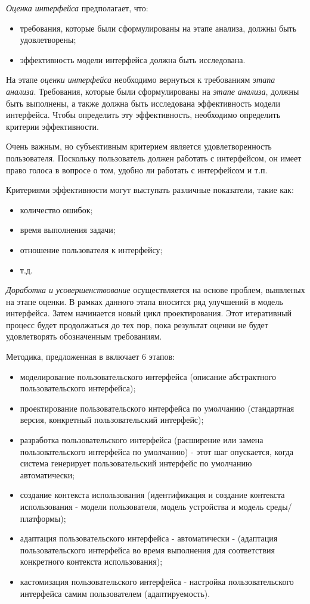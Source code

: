 \textit{Оценка интерфейса} предполагает, что:
\begin{itemize}
	\item требования, которые были сформулированы на этапе анализа, должны быть удовлетворены;
	\item эффективность модели интерфейса должна быть исследована.
\end{itemize}

На этапе \textit{оценки интерфейса} необходимо вернуться к требованиям \textit{этапа анализа}. Требования, которые
были сформулированы на \textit{этапе анализа}, должны быть выполнены, а также должна быть исследована эффективность модели интерфейса.
Чтобы определить эту эффективность, необходимо определить критерии эффективности.

Очень важным, но субъективным критерием является удовлетворенность пользователя. Поскольку пользователь должен работать с интерфейсом, он имеет право голоса в вопросе о том, удобно ли работать с интерфейсом и т.п.

Критериями эффективности могут выступать различные показатели, такие как:
\begin{itemize}
	\item количество ошибок;
	\item время выполнения задачи;
	\item отношение пользователя к интерфейсу;
	\item т.д.
\end{itemize}

\textit{Доработка и усовершенствование} осуществляется на основе проблем, выявленых на этапе оценки. В рамках данного этапа вносится ряд улучшений в модель интерфейса. Затем начинается новый цикл проектирования. Этот итеративный процесс будет продолжаться до тех пор, пока результат оценки не будет удовлетворять обозначенным требованиям. 

Методика, предложенная в \cite{design_multi_adaptive} включает 6 этапов:
\begin{itemize}
	\item моделирование пользовательского интерфейса (описание абстрактного пользовательского интерфейса);
	\item проектирование пользовательского интерфейса по умолчанию (стандартная версия, конкретный пользовательский интерфейс);
	\item разработка пользовательского интерфейса (расширение или замена пользовательского интерфейса по умолчанию) - этот шаг опускается, когда система генерирует пользовательский интерфейс по умолчанию автоматически;
	\item создание контекста использования (идентификация и создание контекста использования - модели пользователя, модель устройства и модель среды/платформы);
	\item адаптация пользовательского интерфейса - автоматически - (адаптация пользовательского интерфейса во время выполнения для соответствия конкретного контекста использования);
	\item кастомизация пользовательского интерфейса - настройка пользовательского интерфейса самим пользователем (адаптируемость).
\end{itemize}

